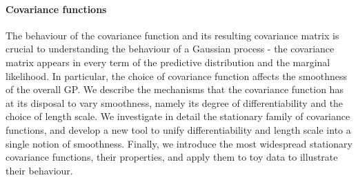 \paragraph{Covariance functions}
The behaviour of the covariance function and its resulting covariance matrix is crucial to understanding the behaviour of a Gaussian process - the covariance matrix appears in every term of the predictive distribution and the marginal likelihood. In particular, the choice of covariance function affects the smoothness of the overall GP. We describe the mechanisms that the covariance function has at its disposal to vary smoothness, namely its degree of differentiability and the choice of length scale. We investigate in detail the stationary family of covariance functions, and develop a new tool to unify differentiability and length scale into a single notion of smoothness. Finally, we introduce the most widespread stationary covariance functions, their properties, and apply them to toy data to illustrate their behaviour.


